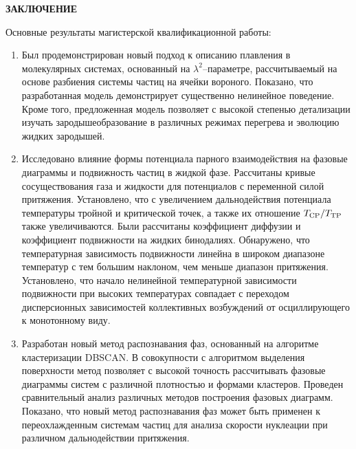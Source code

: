 
\begin{center}
\textbf{\large ЗАКЛЮЧЕНИЕ}
\end{center}


Основные результаты магистерской квалификационной работы:
\begin{enumerate}

    \item Был продемонстрирован новый подход к описанию плавления в молекулярных системах, основанный на $\lambda^2$--параметре, рассчитываемый на основе разбиения системы частиц на ячейки вороного. Показано, что разработанная модель демонстрирует существенно нелинейное поведение. Кроме того, предложенная модель позволяет с высокой степенью детализации изучать зародышеобразование в различных режимах перегрева и эволюцию жидких зародышей.

    \item Исследовано влияние формы потенциала парного взаимодействия на фазовые диаграммы и подвижность частиц в жидкой фазе. Рассчитаны кривые сосуществования газа и жидкости для потенциалов с переменной силой притяжения. Установлено, что с увеличением дальнодействия потенциала температуры тройной и критической точек, а также их отношение $T_{\rm CP}/T_{\rm TP}$ также увеличиваются. Были рассчитаны коэффициент диффузии и коэффициент подвижности на жидких бинодалиях. Обнаружено, что температурная зависимость подвижности линейна в широком диапазоне температур с тем большим наклоном, чем меньше диапазон притяжения. Установлено, что начало нелинейной температурной зависимости подвижности при высоких температурах совпадает с переходом дисперсионных зависимостей коллективных возбуждений от осциллирующего к монотонному виду.

    \item Разработан новый метод распознавания фаз, основанный на алгоритме кластеризации DBSCAN. В совокупности с алгоритмом выделения поверхности метод позволяет с высокой точность рассчитывать фазовые диаграммы систем с различной плотностью и формами кластеров. Проведен сравнительный анализ различных методов построения фазовых диаграмм. Показано, что новый метод распознавания фаз может быть применен к переохлажденным системам частиц для анализа скорости нуклеации при различном дальнодействии притяжения.

\end{enumerate}
